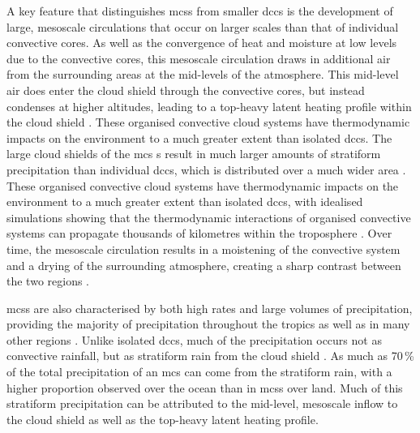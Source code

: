 A key feature that distinguishes \acrshort{mcs}s from smaller \acrshort{dcc}s is the development of large, mesoscale circulations that occur on larger scales than that of individual convective cores.
As well as the convergence of heat and moisture at low levels due to the convective cores, this mesoscale circulation draws in additional air from the surrounding areas at the mid-levels of the atmosphere.
This mid-level air does enter the cloud shield through the convective cores, but instead condenses at higher altitudes, leading to a top-heavy latent heating profile within the cloud shield \citep{schumacher_tropical_2004}.
These organised convective cloud systems have thermodynamic impacts on the environment to a much greater extent than isolated \acrshort{dcc}s.
The large cloud shields of the \acrshort{mcs} s result in much larger amounts of stratiform precipitation than individual \acrshort{dcc}s, which is distributed over a much wider area \citep{houze_chapter_2014}.
These organised convective cloud systems have thermodynamic impacts on the environment to a much greater extent than isolated \acrshort{dcc}s, with idealised simulations showing that the thermodynamic interactions of organised convective systems can propagate thousands of kilometres within the troposphere \citep{beucler_budget_2019}.
Over time, the mesoscale circulation results in a moistening of the convective system and a drying of the surrounding atmosphere, creating a sharp contrast between the two regions \citep{bretherton_energybalance_2005}.

\acrshort{mcs}s are also characterised by both high rates and large volumes of precipitation, providing the majority of precipitation throughout the tropics as well as in many other regions \citep{feng_global_2021}.
Unlike isolated \acrshort{dcc}s, much of the precipitation occurs not as convective rainfall, but as stratiform rain from the cloud shield \citep{schumacher_stratiform_2003}.
As much as 70\,\% of the total precipitation of an \acrshort{mcs} can come from the stratiform rain, with a higher proportion observed over the ocean than in \acrshort{mcs}s over land.
Much of this stratiform precipitation can be attributed to the mid-level, mesoscale inflow to the cloud shield as well as the top-heavy latent heating profile.

